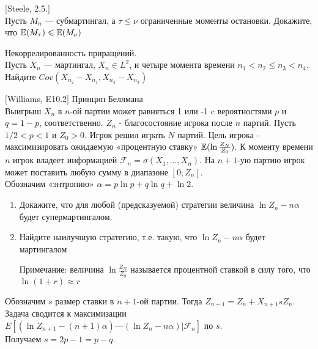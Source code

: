 \begin{problem}
$[$Steele, 2.5.$]$ \\
Пусть $M_{n}$ — субмартингал, а $\tau\le\nu$ ограниченные моменты
остановки. Докажите, что $\mathbb{E}(M_{\tau})\leqslant \mathbb{E}(M_{\nu})$

\begin{sol}

\end{sol}
\end{problem}

\begin{problem}
Некоррелированность приращений. \\
Пусть $X_{n}$ — мартингал, $X_{n}\in L^{2}$, и четыре момента
времени $n_{1}<n_{2}\le n_{3}<n_{4}$. \\
Найдите $Cov(X_{n_{2}}-X_{n_{1}},X_{n_{4}}-X_{n_{3}})$

\begin{sol}

\end{sol}
\end{problem}

\begin{problem}
$[$Williams, E10.2$]$ Принцип Беллмана \\
Выигрыш $X_{n}$ в $n$-ой партии может равняться 1 или -1 c
вероятностями $p$ и $q=1-p$, соответственно. $Z_{n}$ -
благосостояние игрока после $n$ партий. Пусть $1/2<p<1$ и
$Z_{0}>0$. Игрок решил играть $N$ партий. Цель игрока -
максимизировать ожидаемую «процентную ставку»
$\mathbb{E}(\ln\frac{Z_{N}}{Z_{0}})$. К моменту времени $n$ игрок владеет
информацией $\mathcal{F}_{n}=\sigma(X_{1},\ldots,X_{n})$. На $n+1$-ую
партию игрок может поставить любую сумму в диапазоне $[0;Z_{n}]$.
\\
Обозначим «энтропию» $\alpha=p\ln p+q\ln q+\ln 2$.
\begin{enumerate}
\item Докажите, что для любой (предсказуемой) стратегии величина $\ln
Z_{n}-n\alpha$ будет супермартингалом.
\item Найдите наилучшую стратегию, т.е. такую, что $\ln
Z_{n}-n\alpha$ будет мартингалом

Примечание: величина $\ln\frac{Z_{N}}{Z_{0}}$ называется
процентной ставкой в силу того, что $\ln(1+r)\approx r$
\end{enumerate}

\begin{sol}

Обозначим $s$ размер ставки в $n+1$-ой партии. Тогда
$Z_{n+1}=Z_{n}+X_{n+1}sZ_{n}$. \\
Задача сводится к максимизации $E[(\ln Z_{n+1}-(n+1)\alpha) — (\ln
Z_{n}-n\alpha)|\mathcal{F}_{n}]$ по $s$. \\
Получаем $s=2p-1=p-q$.
\end{sol}
\end{problem}

